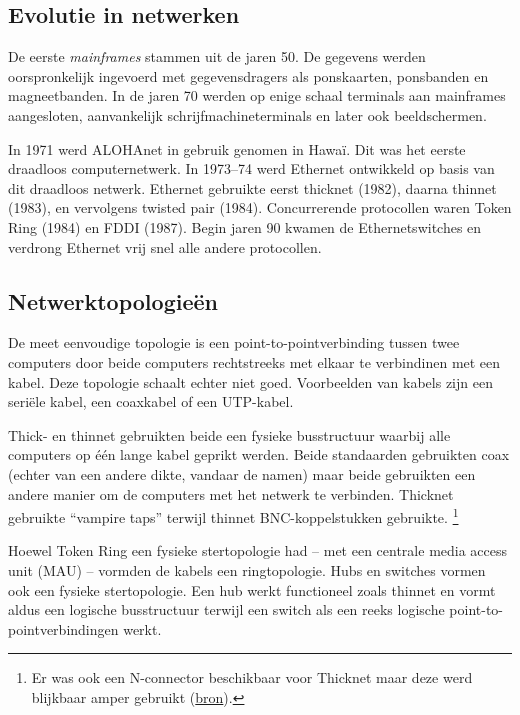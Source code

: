 \subsection{Evolutie in netwerken}

De eerste \emph{mainframes} stammen uit de jaren 50.
De gegevens werden oorspronkelijk ingevoerd met gegevensdragers als ponskaarten, ponsbanden en magneetbanden.
In de jaren 70 werden op enige schaal terminals aan mainframes aangesloten, aanvankelijk schrijfmachineterminals en later ook beeldschermen.

In 1971 werd ALOHAnet in gebruik genomen in Hawaï.
Dit was het eerste draadloos computernetwerk.
In 1973--74 werd Ethernet ontwikkeld op basis van dit draadloos netwerk.
Ethernet gebruikte eerst thicknet (1982), daarna thinnet (1983), en vervolgens twisted pair (1984).
Concurrerende protocollen waren Token Ring (1984) en FDDI (1987).
Begin jaren 90 kwamen de Ethernetswitches en verdrong Ethernet vrij snel alle andere protocollen.



\subsection{Netwerktopologieën}

De meet eenvoudige topologie is een point-to-pointverbinding tussen twee computers door beide computers rechtstreeks met elkaar te verbindinen met een kabel.
Deze topologie schaalt echter niet goed.
Voorbeelden van kabels zijn een seriële kabel, een coax\-kabel of een UTP-kabel.

Thick- en thinnet gebruikten beide een fysieke busstructuur waarbij alle computers op één lange kabel geprikt werden.
Beide standaarden gebruikten coax (echter van een andere dikte, vandaar de namen) maar beide gebruikten een andere manier om de computers met het netwerk te verbinden.
Thicknet gebruikte ``vampire taps'' terwijl thinnet BNC-koppelstukken gebruikte.%
   \footnote{Er was ook een N-connector beschikbaar voor Thicknet maar deze werd blijkbaar amper gebruikt (\href{http://www.mattmillman.com/projects/10base5/}{bron}).}

Hoewel Token Ring een fysieke stertopologie had -- met een centrale media access unit (MAU) -- vormden de kabels een ringtopologie.
Hubs en switches vormen ook een fysieke stertopologie.
Een hub werkt functioneel zoals thinnet en vormt aldus een logische busstructuur terwijl een switch als een reeks logische point-to-pointverbindingen werkt.

